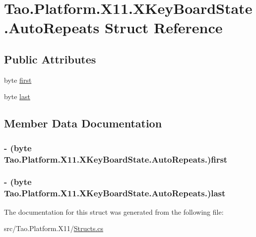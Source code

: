 \hypertarget{struct_tao_1_1_platform_1_1_x11_1_1_x_key_board_state_1_1_auto_repeats}{
\section{Tao.Platform.X11.XKeyBoardState.AutoRepeats Struct Reference}
\label{struct_tao_1_1_platform_1_1_x11_1_1_x_key_board_state_1_1_auto_repeats}
}
\subsection*{Public Attributes}
\begin{DoxyCompactItemize}
\item 
byte \hyperlink{struct_tao_1_1_platform_1_1_x11_1_1_x_key_board_state_1_1_auto_repeats_af26f09f1da8665982f4de5a4bab53738}{first}
\item 
byte \hyperlink{struct_tao_1_1_platform_1_1_x11_1_1_x_key_board_state_1_1_auto_repeats_a4976a9cf31641129713fd7916bd6395e}{last}
\end{DoxyCompactItemize}


\subsection{Member Data Documentation}
\hypertarget{struct_tao_1_1_platform_1_1_x11_1_1_x_key_board_state_1_1_auto_repeats_af26f09f1da8665982f4de5a4bab53738}{
\subsubsection[{first}]{\setlength{\rightskip}{0pt plus 5cm}-\/ (byte Tao.Platform.X11.XKeyBoardState.AutoRepeats.){\bf first}}}
\label{struct_tao_1_1_platform_1_1_x11_1_1_x_key_board_state_1_1_auto_repeats_af26f09f1da8665982f4de5a4bab53738}
\hypertarget{struct_tao_1_1_platform_1_1_x11_1_1_x_key_board_state_1_1_auto_repeats_a4976a9cf31641129713fd7916bd6395e}{
\subsubsection[{last}]{\setlength{\rightskip}{0pt plus 5cm}-\/ (byte Tao.Platform.X11.XKeyBoardState.AutoRepeats.){\bf last}}}
\label{struct_tao_1_1_platform_1_1_x11_1_1_x_key_board_state_1_1_auto_repeats_a4976a9cf31641129713fd7916bd6395e}


The documentation for this struct was generated from the following file:\begin{DoxyCompactItemize}
\item 
src/Tao.Platform.X11/\hyperlink{_structs_8cs}{Structs.cs}\end{DoxyCompactItemize}
